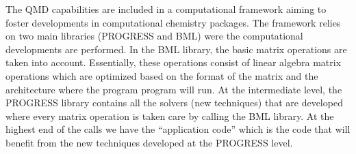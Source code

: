 
The QMD capabilities are included in a computational framework aiming to foster developments in computational chemistry packages. The framework relies on two main libraries (PROGRESS and BML) were the computational developments are performed. In the BML library, the basic matrix operations are taken into account. Essentially, these operations consist of linear algebra matrix operations which are optimized based on the format of the matrix and the architecture where the program program will run. At the intermediate level, the PROGRESS library contains all the solvers (new techniques) that are developed where every matrix operation is taken care by calling the BML library. At the highest end of the calls we have the ``application code'' which is the code that will benefit from the new techniques developed at the PROGRESS level. 
% 
\vspace{0.5cm}
